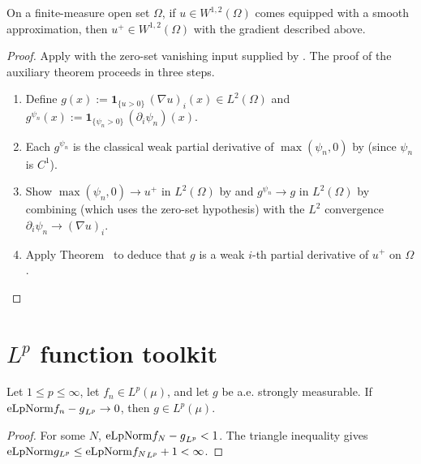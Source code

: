 \begin{theorem}
\label{thm:MemW1pWitness_posPart}
\leanok
{}
On a finite-measure open set $\Omega$, if $u \in W^{1,2}(\Omega)$ comes
equipped with a smooth approximation, then $u^+ \in W^{1,2}(\Omega)$ with
the gradient described above.
\end{theorem}

\begin{proof}
\leanok
{}

Apply  with the zero-set vanishing input supplied by
. The proof of the auxiliary
theorem proceeds in three steps.
\begin{enumerate}
\item Define $g(x) := \mathbf{1}_{\{u > 0\}}\, (\nabla u)_i(x) \in L^2(\Omega)$
and $g^{\psi_n}(x) := \mathbf{1}_{\{\psi_n > 0\}}\,(\partial_i \psi_n)(x)$.
\item Each $g^{\psi_n}$ is the classical weak partial derivative of
$\max(\psi_n, 0)$ by
 (since $\psi_n$ is
$C^1$).
\item Show $\max(\psi_n, 0) \to u^+$ in $L^2(\Omega)$ by
 and $g^{\psi_n} \to g$ in
$L^2(\Omega)$ by combining
 (which uses
the zero-set hypothesis) with the $L^2$ convergence
$\partial_i \psi_n \to (\nabla u)_i$.
\item Apply Theorem~ to deduce
that $g$ is a weak $i$-th partial derivative of $u^+$ on $\Omega$.
\end{enumerate}
\end{proof}

\section{$L^p$ function toolkit}

\begin{theorem}
\label{thm:memLp_of_tendsto_eLpNorm}
\leanok
Let $1 \le p \le \infty$, let $f_n \in L^p(\mu)$, and let $g$ be a.e.
strongly measurable. If $\mathrm{eLpNorm}{f_n - g}_{L^p} \to 0$, then
$g \in L^p(\mu)$.
\end{theorem}

\begin{proof}
\leanok
{}

For some $N$, $\mathrm{eLpNorm}{f_N - g}_{L^p} < 1$. The triangle inequality
gives $\mathrm{eLpNorm}{g}_{L^p} \le \mathrm{eLpNorm}{f_N}_{L^p} + 1 < \infty$.
\end{proof}

